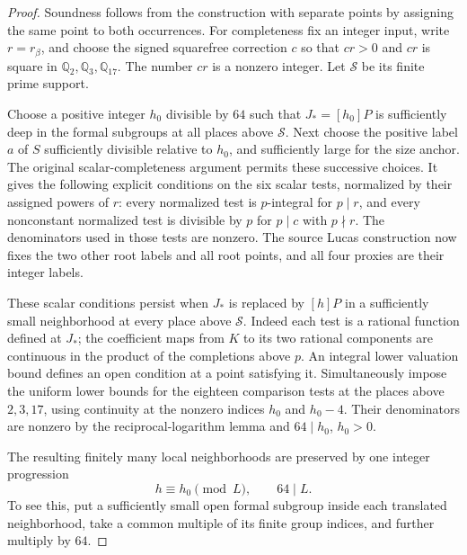 \begin{proof}
Soundness follows from the construction with separate points by assigning
the same point to both occurrences.  For completeness fix an integer input,
write $r=r_\beta$, and choose the signed squarefree correction $c$ so that
$cr>0$ and $cr$ is square in $\mathbb Q_2,\mathbb Q_3,\mathbb Q_{17}$.
The number $cr$ is a nonzero integer.  Let $\mathcal S$ be its finite prime
support.

Choose a positive integer $h_0$ divisible by $64$ such that
$J_*= [h_0]P$ is sufficiently deep in the formal subgroups at all places
above $\mathcal S$.  Next choose the positive label $a$ of $S$ sufficiently
divisible relative to $h_0$, and sufficiently large for the size anchor.
The original scalar-completeness argument permits these successive choices.
It gives the following explicit conditions on the six scalar tests,
normalized by their assigned powers of $r$: every normalized test is
$p$-integral for $p\mid r$, and every nonconstant normalized test is divisible
by $p$ for $p\mid c$ with $p\nmid r$.  The denominators used in those tests
are nonzero.  The source Lucas construction now fixes the two other root
labels and all root points, and all four proxies are their integer labels.

These scalar conditions persist when $J_*$ is replaced by $[h]P$ in a
sufficiently small neighborhood at every place above $\mathcal S$.
Indeed each test is a rational function defined at $J_*$; the coefficient
maps from $K$ to its two rational components are continuous in the product
of the completions above $p$.  An integral lower valuation bound defines
an open condition at a point satisfying it.  Simultaneously impose the
uniform lower bounds for the eighteen comparison tests at the places
above $2,3,17$, using continuity at the nonzero indices $h_0$ and $h_0-4$.
Their denominators are nonzero by the reciprocal-logarithm lemma and
$64\mid h_0$, $h_0>0$.

The resulting finitely many local neighborhoods are preserved by one
integer progression
\[
                       h\equiv h_0\pmod L,
                       \qquad 64\mid L.
\]
To see this, put a sufficiently small open formal subgroup inside each
translated neighborhood, take a common multiple of its finite group
indices, and further multiply by $64$.


\end{proof}
